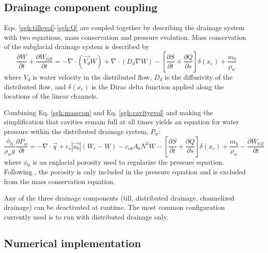 \subsection{Drainage component coupling}
Eqs. \ref{sgh:tillevol}-\ref{sgh:Q} are coupled together by describing the drainage system with two equations,
mass conservation and pressure evolution.
Mass conservation of the subglacial drainage system is described by
\begin{equation}
 \frac{\partial W}{\partial t} +  \frac{\partial W_{till}}{\partial t} = 
    - \nabla \cdot (\vec{V_d} W) + \nabla \cdot (D_d \nabla W) 
    - \left[ \frac{\partial S}{\partial t} + \frac{\partial Q}{\partial s} \right] \delta(x_c)
    + \frac{m_b}{\rho_w}
\label{sgh:masscon}
\end{equation}
where 
$V_d$ is water velocity in the distributed flow, $D_d$ is the diffusivity of the distributed flow, 
and $\delta(x_c)$ is the Dirac delta function applied along the locations of the linear channels.

Combining Eq. \ref{sgh:masscon} and Eq. \ref{sgh:cavityevol} and making the simplification that cavities remain full at all times 
yields an equation for water pressure within the distributed drainage system, $P_w$:
\begin{equation}
 \frac{\phi_0}{\rho_w g} \frac{\partial P_w}{\partial t} =
    - \nabla \cdot \vec{q} 
    +  c_s |\vec{u_b}| (W_r - W) - c_{cd} A_b N^3 W
    - \left[ \frac{\partial S}{\partial t} + \frac{\partial Q}{\partial s} \right] \delta(x_c)
    + \frac{m_b}{\rho_w}
    - \frac{\partial W_{till}}{\partial t}
\label{sgh:pressure}
\end{equation}
where $\phi_0$ is an englacial porosity used to regularize the pressure equation.
Following \citet{Bueler2015}, the porosity is only included in the pressure equation
and is excluded from the mass conservation equation.

Any of the three drainage components (till, distributed drainage, channelized drainage) can be deactivated at runtime.  
The most common configuration currently used is to run with distributed drainage only.

\subsection{Numerical implementation}

